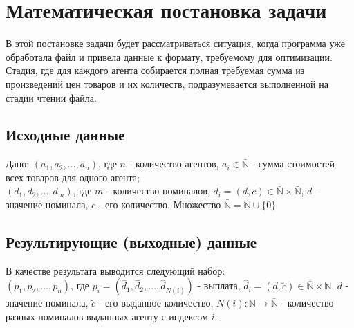 \documentclass[12pt]{extarticle}
\begin{document}
\section{Математическая постановка задачи}

В этой постановке задачи будет рассматриваться ситуация, когда программа уже обработала файл и привела данные к формату, требуемому для оптимизации. Стадия, где для каждого агента собирается полная требуемая сумма из произведений цен товаров и их количеств, подразумевается выполненной на стадии чтении файла.

\subsection{Исходные данные}
Дано: $(a_1, a_2, \dots, a_n)$, где $n$ - количество агентов, $a_i \in \bar{\mathbb{N}}$ - сумма стоимостей всех товаров для одного агента; \\
$(d_1, d_2, \dots, d_m)$, где $m$ - количество номиналов, $d_i = (d, c) \in \bar{\mathbb{N}} \times \bar{\mathbb{N}}$, $d$ - значение номинала, $c$ - его количество.
Множество $\bar{\mathbb{N}} = \mathbb{N}\cup\{0\}$

\subsection{Результирующие (выходные) данные}

В качестве результата выводится следующий набор: \\
$(p_1, p_2, \dots, p_n)$, где $p_i = (\hat{d}_1, \hat{d}_2, \dots, \hat{d}_{N(i)})$ - выплата, $\hat{d}_i = (d, \tilde{c}) \in \bar{\mathbb{N}} \times \mathbb{N}$, $d$ - значение номинала, $\tilde{c}$ - его выданное количество, $N(i): \mathbb{N} \rightarrow \bar{\mathbb{N}}$ - количество разных номиналов выданных агенту с индексом $i$.
\end{document}
